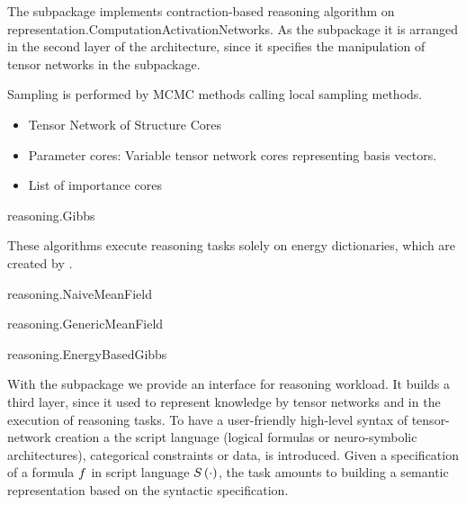 The \spreasoning subpackage implements contraction-based reasoning algorithm on representation.ComputationActivationNetworks.
As the \sprepresentation subpackage it is arranged in the second layer of the \tnreason architecture, since it specifies the manipulation of tensor networks in the \spengine subpackage.


Sampling is performed by MCMC methods calling local sampling methods.

\begin{itemize}
	\item Tensor Network of Structure Cores
	\item Parameter cores: Variable tensor network cores representing basis vectors.
	\item List of importance cores
\end{itemize}

\begin{centeredcode}
	reasoning.Gibbs
\end{centeredcode}


These algorithms execute reasoning tasks solely on energy dictionaries, which are created by .

\begin{centeredcode}
	reasoning.NaiveMeanField
\end{centeredcode}

\begin{centeredcode}
	reasoning.GenericMeanField
\end{centeredcode}

\begin{centeredcode}
	reasoning.EnergyBasedGibbs
\end{centeredcode}




\label{sec:implementationApplication}

With the \spapplication subpackage we provide an interface for reasoning workload.
It builds a third layer, since it used \sprepresentation to represent knowledge by tensor networks and \spreasoning in the execution of reasoning tasks.
%
To have a user-friendly high-level syntax of tensor-network creation a the script language (logical formulas or neuro-symbolic architectures), categorical constraints or data, is introduced.
Given a specification of a formula $f$ in script language $S\left(\cdot\right)$, the task amounts to building a semantic representation based on the syntactic specification.

